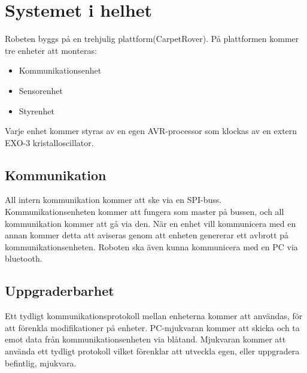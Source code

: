 \section{Systemet i helhet}
Robeten byggs på en trehjulig plattform(CarpetRover). På plattformen kommer tre enheter att monteras:
\begin{itemize}
        \item Kommunikationsenhet
        \item Sensorenhet
        \item Styrenhet
\end{itemize}
Varje enhet kommer styras av en egen AVR-processor som klockas av en extern EXO-3 kristalloscillator.

\subsection{Kommunikation}
All intern kommunikation kommer att ske via en SPI-buss. Kommunikationsenheten kommer att fungera som master på bussen, och all kommunikation kommer att gå via den. När en enhet vill kommunicera med en annan kommer detta att aviseras genom att enheten genererar ett avbrott på kommunikationsenheten. 
Roboten ska även kunna kommunicera med en PC via bluetooth.

\subsection{Uppgraderbarhet}
Ett tydligt kommunikationsprotokoll mellan enheterna kommer att användas, för att förenkla modifikationer på enheter. PC-mjukvaran kommer att skicka och ta emot data från kommunikationsenheten via blåtand.
Mjukvaran kommer att använda ett tydligt protokoll vilket förenklar att utveckla egen, eller uppgradera befintlig, mjukvara.
